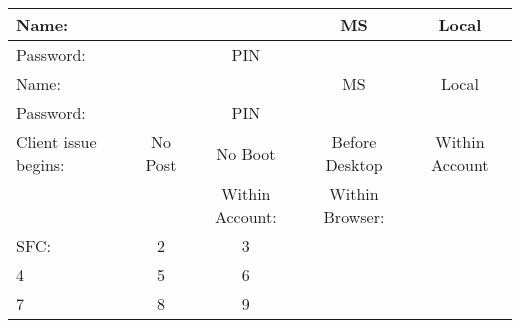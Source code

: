 \documentclass{article}
\begin{document}
\begin{center}
  \begin{tabular}{ | l | c | c | c | c |}
    \hline
    Name: & \multicolumn{2}{|c|}{ \qquad \qquad} & MS & Local \\ \hline
    Password: & \qquad & PIN & \multicolumn{2}{|c|}{\quad}  \\  \hline
    Name: &  \multicolumn{2}{|c|}{ \qquad \qquad} & MS & Local \\ \hline
    Password: & \qquad & PIN & \multicolumn{2}{|c|}{\quad}  \\  \hline
    Client issue begins: & No Post & No Boot & Before Desktop & Within Account  \\
    & & Within Account: & Within Browser: & \\
    SFC: & 2 & 3 & \\ \hline
    4 & 5 & 6 & \\ \hline
    7 & 8 & 9 & \\
    \hline
  \end{tabular}
\end{center}
\end{document}

